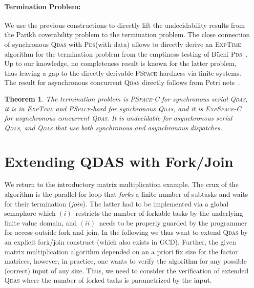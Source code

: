 \documentclass[runningheads,oribibl,]{article}
\newcommand{\pds}{\textsc{Pds}\xspace}
\newcommand{\qdas}{\textsc{Qdas}\xspace}
\newcommand{\dexpspacecomplete}{\textsc{ExpSpace-C}\xspace}
\newcommand{\pspace}{\textsc{PSpace}\xspace}
\newcommand{\pspacecomplete}{\textsc{PSpace-C}\xspace}
\newcommand{\dexptime}{\textsc{ExpTime}\xspace}
\newtheorem{theorem}{Theorem}{}
\begin{document}
\paragraph{\bf Termination Problem:}


We use the previous constructions to directly
lift the undecidability results from the Parikh coverability problem to the termination problem.
The close connection of synchronous \qdas with \pds (with data)
allows to directly derive an \dexptime algorithm for the termination problem from the emptiness testing of
Büchi \pds~\cite{esparza-j-2000-232-a}. Up to our knowledge,
no completeness result is known for the latter problem, thus leaving a gap to the directly derivable \pspace-hardness via finite systems.
The result for  asynchronous concurrent
\qdas directly follows from Petri nets~\cite{lipton,rackoff}.

\begin{theorem}\label{thm:termination}
  The termination problem is  \pspacecomplete for synchronous serial
  \qdas, it is in \dexptime and \pspace-hard for synchronous \qdas,
  and it is \dexpspacecomplete for asynchronous concurrent \qdas.
  It is undecidable for asynchronous serial \qdas, and \qdas that
  use both synchronous and asynchronous dispatches.
\end{theorem}



\section{Extending QDAS with Fork/Join\label{sec:forkjoin}}


We return to the introductory matrix multiplication example. The crux of the
algorithm is the parallel for-loop that \emph{forks} a finite number of subtasks and waits
for their termination (\emph{join}).  The latter had to be implemented via a global
semaphore which $(i)$~restricts the number of forkable tasks by the underlying
finite value domain, and $(ii)$~needs to be properly guarded by the programmer for access outside fork and join.
In the following we thus
want to extend \qdas by an explicit fork/join construct (which also exists in GCD).
Further, the given matrix multiplication algorithm depended on an a priori fix size
for the factor matrices, however,
in practice, one wants to verify the algorithm for any possible (correct) input
of any size. Thus, we need to consider the verification of extended
\qdas  where the number of forked tasks is parametrized by the
input.
\end{document}
